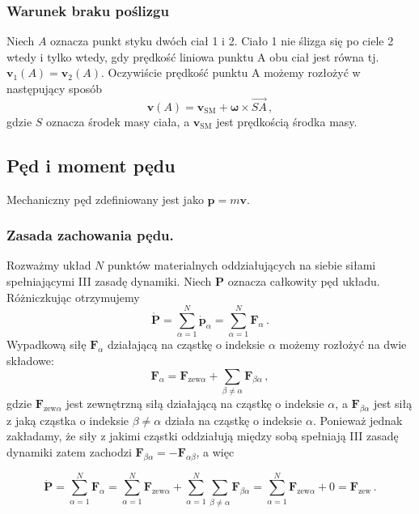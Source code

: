 \documentclass[../main.tex]{subfiles}
\begin{document}
\subsubsection*{Warunek braku poślizgu}
Niech \(A\) oznacza punkt styku dwóch ciał 1 i 2. Ciało 1 nie ślizga się po ciele 2 wtedy i tylko
wtedy, gdy prędkość liniowa punktu A obu ciał jest równa tj. \(\mathbf{v}_1(A)=\mathbf{v}_2(A)\).
Oczywiście prędkość punktu A możemy rozłożyć w następujący sposób
\begin{equation*}
    \mathbf{v}(A)=\mathbf{v}_\text{SM}+\boldsymbol{\omega}\times\overrightarrow{SA}\,,
\end{equation*}
gdzie \(S\) oznacza środek masy ciała, a \(\mathbf{v}_\text{SM}\) jest prędkością środka masy.

\subsection{Pęd i moment pędu}
Mechaniczny pęd zdefiniowany jest jako \(\mathbf{p}=m\mathbf{v}\).
\subsubsection{Zasada zachowania pędu.}
Rozważmy układ \(N\) punktów materialnych oddziałujących na siebie siłami spełniającymi III zasadę
dynamiki. Niech \(\mathbf{P}\) oznacza całkowity pęd układu. Różniczkując otrzymujemy
\begin{equation*}
    \dot{\mathbf{P}}=\sum_{\alpha=1}^N\dot{\mathbf{p}}_\alpha=\sum_{\alpha=1}^N\mathbf{F}_\alpha\,.
\end{equation*}
Wypadkową siłę \(\mathbf{F}_\alpha\) działającą na cząstkę o indeksie \(\alpha\) możemy rozłożyć na
    dwie składowe: \begin{equation*}
    \mathbf{F}_\alpha=\mathbf{F}_{\text{zew}\alpha}+\sum_{\beta\neq\alpha}\mathbf{F}_{\beta\alpha}\,,
\end{equation*}
gdzie \(\mathbf{F}_{\text{zew}\alpha}\) jest zewnętrzną siłą działającą na cząstkę o indeksie
\(\alpha\), a \(\mathbf{F}_{\beta\alpha}\) jest siłą z jaką cząstka o indeksie \(\beta\neq\alpha\)
działa na cząstkę o indeksie \(\alpha\). Ponieważ jednak zakładamy, że siły z jakimi cząstki
oddziałują między sobą spełniają III zasadę dynamiki zatem zachodzi
\(\mathbf{F}_{\beta\alpha}=-\mathbf{F}_{\alpha\beta}\), a więc

\begin{equation*}
    \dot{\mathbf{P}}=\sum_{\alpha=1}^N\mathbf{F}_\alpha=\sum_{\alpha=1}^N\mathbf{F}_{\text{zew}\alpha}+\sum_{\alpha=1}^N\sum_{\beta\neq\alpha}\mathbf{F}_{\beta\alpha}=\sum_{\alpha=1}^N\mathbf{F}_{\text{zew}\alpha}+0=\mathbf{F}_\text{zew}\,.
\end{equation*}
\end{document}
